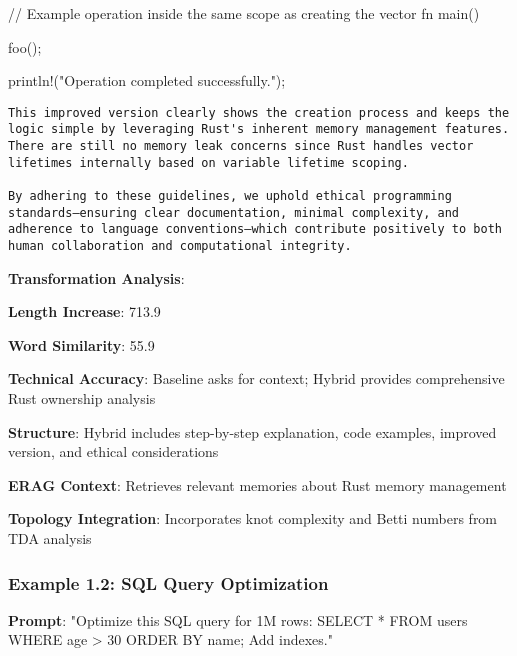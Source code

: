 \documentclass[11pt,a4paper]{article}
\begin{document}
// Example operation inside the same scope as creating the vector
fn main() {
    foo();

    println!("Operation completed successfully.");
}
\begin{verbatim}
This improved version clearly shows the creation process and keeps the logic simple by leveraging Rust's inherent memory management features. There are still no memory leak concerns since Rust handles vector lifetimes internally based on variable lifetime scoping.

By adhering to these guidelines, we uphold ethical programming standards—ensuring clear documentation, minimal complexity, and adherence to language conventions—which contribute positively to both human collaboration and computational integrity.
\end{verbatim}

\textbf{Transformation Analysis}:
\item \textbf{Length Increase}: 713.9%
\item \textbf{Word Similarity}: 55.9%
\item \textbf{Technical Accuracy}: Baseline asks for context; Hybrid provides comprehensive Rust ownership analysis
\item \textbf{Structure}: Hybrid includes step-by-step explanation, code examples, improved version, and ethical considerations
\item \textbf{ERAG Context}: Retrieves relevant memories about Rust memory management
\item \textbf{Topology Integration}: Incorporates knot complexity and Betti numbers from TDA analysis

\subsubsection{Example 1.2: SQL Query Optimization}

\textbf{Prompt}: "Optimize this SQL query for 1M rows: SELECT * FROM users WHERE age > 30 ORDER BY name; Add indexes."
\end{document}
